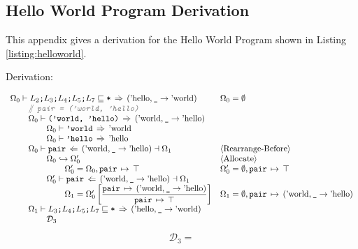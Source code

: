 \documentclass[12pt,twoside]{report}
\begin{document}
\subsection{Hello World Program Derivation}
\label{appendix:helloworldderivation}
This appendix gives a derivation for the Hello World Program shown in Listing \ref{listing:helloworld}.

Derivation:

{\smaller
\[\begin{array}{ll}
  \Omega_0 \vdash L_2\mono{;}L_3\mono{;}L_4\mono{;}L_5\mono{;}L_7 \subtype \mono{*} \movearrowabs (\atom{hello}, \mono{\_} \rightarrow \atom{world}) &
  \Omega_0 = \emptyset \\

  \otab \ocomment{\mono{pair = ('world, 'hello)}} \\
  \otab \Omega_0 \vdash \mono{('world, 'hello)} \movearrowabs (\atom{world}, \mono{\_} \rightarrow \atom{hello}) \\
  \otab \otab \Omega_0 \vdash \mono{'world} \movearrowabs \atom{world} \\
  \otab \otab \Omega_0 \vdash \mono{'hello} \movearrowabs \atom{hello} \\
  \otab\Omega_0 \vdash \mono{pair} \writearrowabs (\atom{world}, \mono{\_} \rightarrow \atom{hello}) \dashv \Omega_1 &
   \langle\text{Rearrange-Before}\rangle \\
  \otab\otab \Omega_0 \rearrangearrow \Omega_0' &
   \langle\text{Allocate}\rangle \\
  \otab\otab\otab \Omega_0' = \Omega_0,\absmapm{pair}{\top} &
   \Omega_0' = \emptyset, \absmapm{pair}{\top} \\
  \otab \otab \Omega_0' \vdash \mono{pair} \writearrowabs (\atom{world}, \mono{\_} \rightarrow \atom{hello}) \dashv \Omega_1 \\
  \otab\otab\otab \Omega_1 = \Omega_0'\left[\dfrac{\absmapm{pair}{(\atom{world}, \mono{\_} \rightarrow \atom{hello})}}{\absmapm{pair}{\top}}\right] &
   \Omega_1 = \emptyset,\absmapm{pair}{(\atom{world}, \mono{\_} \rightarrow \atom{hello})}\\
  \otab \Omega_1 \vdash L_3\mono{;}L_4\mono{;}L_5\mono{;}L_7 \subtype \mono{*} \movearrowabs (\atom{hello}, \mono{\_} \rightarrow \atom{world}) \\
  \otab \otab \mathcal{D}_3 \\

\end{array}\]
\[\begin{array}{ll}
  \mathcal{D}_3 = \\\\


\end{array}\]}
\end{document}
